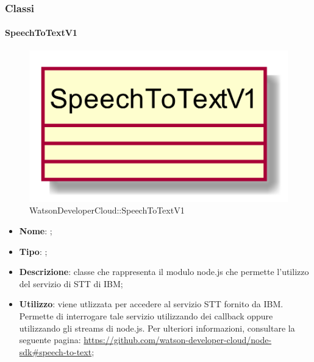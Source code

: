 \subsubsection{Classi}
\hypertarget{SpeechToTextV1_label}{\paragraph{SpeechToTextV1}}
\begin{figure}[h]
	\centering
	\includegraphics[width=\textwidth,height=\textheight,keepaspectratio]{images/ClassSpeechToTextV1.png}
	\caption{WatsonDeveloperCloud::SpeechToTextV1}
\end{figure}
\begin{itemize}
	\item \textbf{Nome}: ;
	\item \textbf{Tipo}: ;
	\item \textbf{Descrizione}: classe che rappresenta il modulo node.js che permette l'utilizzo del servizio di STT di IBM;
	\item \textbf{Utilizzo}: viene utlizzata per accedere al servizio STT fornito da IBM. Permette di interrogare tale servizio utilizzando dei callback oppure utilizzando gli streams di node.js. Per ulteriori informazioni, consultare la seguente pagina: \url{https://github.com/watson-developer-cloud/node-sdk#speech-to-text};
\end{itemize}
